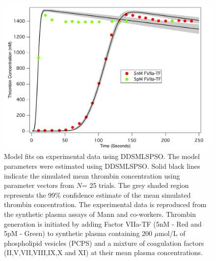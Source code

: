 \documentclass[12pt]{article}
\begin{document}
\begin{figure}[H]
\centering
\includegraphics[width=1.0\textwidth,height=0.5\textheight]{./figs/Figure_4_Sim_Train_E1_E5.pdf}
\caption{Model fits on experimental data using DDSMLSPSO. The model parameters were estimated using DDSMLSPSO. Solid black lines indicate the simulated mean thrombin concentration using parameter vectors from $N$= 25 trials. The grey shaded region represents the 99\% confidence estimate of the mean simulated thrombin concentration. The experimental data is reproduced from the synthetic plasma assays of Mann and co-workers. Thrombin generation is initiated by adding Factor VIIa-TF (5nM - Red and 5pM - Green) to synthetic plasma containing 200 $\mu$mol/L of phospholipid vesicles (PCPS) and a mixture of coagulation factors (II,V,VII,VIII,IX,X and XI) at their mean plasma concentrations.
}\label{fig-train}
\end{figure}
\end{document}
